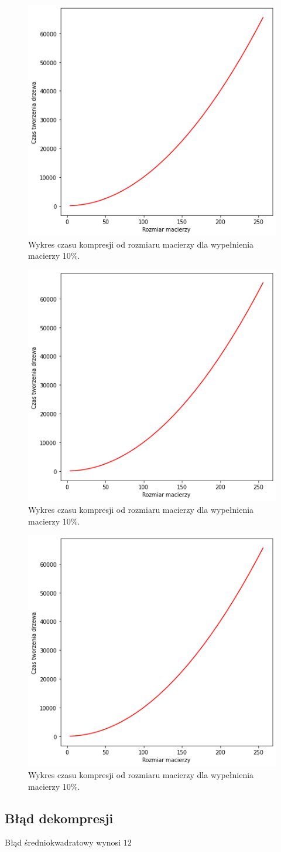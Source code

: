 \documentclass{article}
\begin{document}
\begin{figure}[H]
    \centering
  \includegraphics[width=0.6\linewidth]{img/output.png}
  \caption{Wykres czasu kompresji od rozmiaru macierzy dla wypełnienia macierzy 10\%.}
\end{figure}

\begin{figure}[H]
    \centering
  \includegraphics[width=0.6\linewidth]{img/output.png}
  \caption{Wykres czasu kompresji od rozmiaru macierzy dla wypełnienia macierzy 10\%.}
\end{figure}

\begin{figure}[H]
    \centering
  \includegraphics[width=0.6\linewidth]{img/output.png}
  \caption{Wykres czasu kompresji od rozmiaru macierzy dla wypełnienia macierzy 10\%.}
\end{figure}

\subsection{Błąd dekompresji}

Błąd średniokwadratowy wynosi $ 12 $
\end{document}
